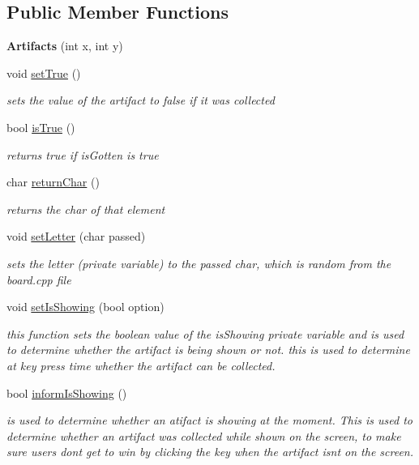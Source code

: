 \subsection*{Public Member Functions}
\begin{DoxyCompactItemize}
\item 
\hypertarget{class_artifacts_a3b0f2c2b47dcfe960250d4be0aab18c2}{}{\bfseries Artifacts} (int x, int y)\label{class_artifacts_a3b0f2c2b47dcfe960250d4be0aab18c2}

\item 
void \hyperlink{class_artifacts_a627fd75502433f38d442ceefd9f3fb60}{set\+True} ()
\begin{DoxyCompactList}\small\item\em sets the value of the artifact to false if it was collected \end{DoxyCompactList}\item 
bool \hyperlink{class_artifacts_aff537d250b76e2938ebf5dafc57f9d72}{is\+True} ()
\begin{DoxyCompactList}\small\item\em returns true if is\+Gotten is true \end{DoxyCompactList}\item 
char \hyperlink{class_artifacts_a2627b4e39e02808cd2d3e4ef8d915278}{return\+Char} ()
\begin{DoxyCompactList}\small\item\em returns the char of that element \end{DoxyCompactList}\item 
void \hyperlink{class_artifacts_a305c89b59aa9268ea088811fee516d7a}{set\+Letter} (char passed)
\begin{DoxyCompactList}\small\item\em sets the letter (private variable) to the passed char, which is random from the board.\+cpp file \end{DoxyCompactList}\item 
void \hyperlink{class_artifacts_a89fe3109ee0284df7615a8c04e8260a6}{set\+Is\+Showing} (bool option)
\begin{DoxyCompactList}\small\item\em this function sets the boolean value of the is\+Showing private variable and is used to determine whether the artifact is being shown or not. this is used to determine at key press time whether the artifact can be collected. \end{DoxyCompactList}\item 
bool \hyperlink{class_artifacts_afe12fd42ca30d711f1479b95be7e6935}{inform\+Is\+Showing} ()
\begin{DoxyCompactList}\small\item\em is used to determine whether an atifact is showing at the moment. This is used to determine whether an artifact was collected while shown on the screen, to make sure users don\textquotesingle{}t get to win by clicking the key when the artifact isn\textquotesingle{}t on the screen. \end{DoxyCompactList}\end{DoxyCompactItemize}


